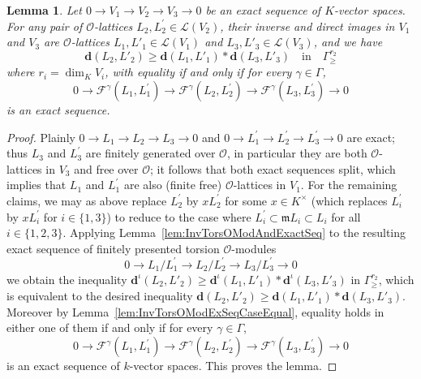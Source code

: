 \documentclass[11pt]{article}
\newtheorem{lemm}[theo]{Lemma}
\theoremstyle{definition}
\numberwithin{equation}{section}
\numberwithin{figure}{section}
\numberwithin{table}{section}
\begin{document}
\begin{lemm}\label{lem:RelPos=000026ExcSeq}
Let $0\rightarrow V_{1}\rightarrow V_{2}\rightarrow V_{3}\rightarrow0$ be an exact sequence of $K$-vector spaces. For any pair of $\mathcal{O}$-lattices $L_{2},L_{2}^{\prime}\in\mathcal{L}(V_{2})$, their inverse and direct images in $V_{1}$ and $V_{3}$ are $\mathcal{O}$-lattices $L_{1},L'_{1}\in\mathcal{L}(V_{1})$ and $L_{3},L'_{3}\in\mathcal{L}(V_{3})$, and we have
\[
\mathbf{d}(L_{2},L'_{2})\geq\mathbf{d}(L_{1},L'_{1})\ast\mathbf{d}(L_{3},L'_{3})\quad\text{in}\quad\Gamma_{\geq}^{r_{2}}
\]
where $r_{i}=\dim_{K}V_{i}$, with equality if and only if for every $\gamma\in\Gamma$,
\[
0\rightarrow\mathcal{F}^{\gamma}(L_{1},L_{1}^{\prime})\rightarrow\mathcal{F}^{\gamma}(L_{2},L_{2}^{\prime})\rightarrow\mathcal{F}^{\gamma}(L_{3},L_{3}^{\prime})\rightarrow0
\]
is an exact sequence.
\end{lemm}
\begin{proof}
Plainly $0\rightarrow L_{1}\rightarrow L_{2}\rightarrow L_{3}\rightarrow0$ and $0\rightarrow L_{1}^{\prime}\rightarrow L_{2}^{\prime}\rightarrow L_{3}^{\prime}\rightarrow0$ are exact; thus $L_{3}$ and $L_{3}^{\prime}$ are finitely generated over $\mathcal{O}$, in particular they are both $\mathcal{O}$-lattices in $V_{3}$ and free over $\mathcal{O}$; it follows that both exact sequences split, which implies that $L_{1}$ and $L_{1}^{\prime}$ are also (finite free) $\mathcal{O}$-lattices in $V_{1}$. For the remaining claims, we may as above replace $L_{2}^{\prime}$ by $xL_{2}^{\prime}$ for some $x\in K^{\times}$ (which replaces $L_{i}^{\prime}$ by $xL_{i}^{\prime}$ for $i\in\{1,3\}$) to reduce to the case where $L_{i}^{\prime}\subset\mathfrak{m}L_{i}\subset L_{i}$ for all $i\in\{1,2,3\}$. Applying Lemma~\ref{lem:InvTorsOModAndExactSeq} to the resulting exact sequence of finitely presented torsion $\mathcal{O}$-modules
\[
0\rightarrow L_{1}/L_{1}^{\prime}\rightarrow L_{2}/L_{2}^{\prime}\rightarrow L_{3}/L_{3}^{\prime}\rightarrow0
\]
we obtain the inequality $\mathbf{d}^{\iota}(L_{2},L'_{2})\geq\mathbf{d}^{\iota}(L_{1},L'_{1})\ast\mathbf{d}^{\iota}(L_{3},L'_{3})$ in $\Gamma_{\geq}^{r_{2}}$, which is equivalent to the desired inequality $\mathbf{d}(L_{2},L'_{2})\geq\mathbf{d}(L_{1},L'_{1})\ast\mathbf{d}(L_{3},L'_{3})$. Moreover by Lemma~\ref{lem:InvTorsOModExSeqCaseEqual}, equality holds in either one of them if and only if for every $\gamma\in\Gamma$,
\[
0\rightarrow\mathcal{F}^{\gamma}(L_{1},L_{1}^{\prime})\rightarrow\mathcal{F}^{\gamma}(L_{2},L_{2}^{\prime})\rightarrow\mathcal{F}^{\gamma}(L_{3},L_{3}^{\prime})\rightarrow0
\]
is an exact sequence of $k$-vector spaces. This proves the lemma.
\end{proof}
\end{document}
